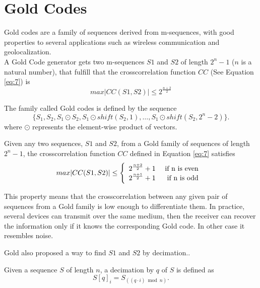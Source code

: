 \section{Gold Codes}

Gold codes\cite{gold_codes} are a family of sequences derived from
m-sequences, with good properties to several
applications such as wireless communication and geolocalization.\\

A Gold Code generator gets two m-sequences $S1$ and $S2$  of length
 $2^{n}-1$ ($n$ is a natural number), that fulfill that the crosscorrelation function $CC$ (See Equation \eqref{eq:7}) is
  \begin{equation}\label{gold:eq:1}
      max |CC(S1, S2)| \leq 2^{\frac{n+2}{2}}
    \end{equation}

The family called Gold codes is defined by the sequence
$$
\{S_1, S_2, S_1\odot S_2, S_1\odot shift(S_2, 1), \ldots, S_1\odot shift(S_2,2^n-2)\}.
$$
where $\odot$ represents the element-wise product of vectors.


\begin{property}
  Given any two sequences, $S1$ and $S2$, from a Gold family of sequences of length
  $2^{n}-1$,  the crosscorrelation function $CC$ defined in Equation \eqref{eq:7} satisfies
  \begin{equation}
        max |CC(S1, S2)| \leq \left\{\begin{array}{lr}
            2^{\frac{n+2}{2}}+1 & \textnormal{ if n is even } \\
            2^{\frac{n+1}{2}}+1 & \textnormal{ if n is odd } \\
        \end{array}\right.
  \end{equation}
\end{property}

This property means that the crosscorrelation between any given pair of
sequences from a Gold family is low enough to differentiate them.
 In practice, several devices can transmit over the same medium, then the receiver
 can recover the information only if it knows the corresponding Gold code. In other
 case it  resembles noise.

Gold also proposed  a way to find $S1$ and $S2$ by decimation..

\begin{definition}[Decimation]
  Given a sequence $S$ of length $n$, a decimation by $q$ of $S$ is defined as
  \begin{equation}
    S[q]_{i} = S_{((q·i) \bmod n)}.
  \end{equation}
\end{definition}

